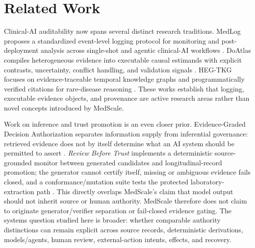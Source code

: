 \section{Related Work}

Clinical-AI auditability now spans several distinct research traditions. MedLog proposes a standardized event-level logging protocol for monitoring and post-deployment analysis across single-shot and agentic clinical-AI workflows \citep{Noori.2025}. DoAtlas compiles heterogeneous evidence into executable causal estimands with explicit contrasts, uncertainty, conflict handling, and validation signals \citep{Li.2026}. HEG-TKG focuses on evidence-traceable temporal knowledge graphs and programmatically verified citations for rare-disease reasoning \citep{Ahmed.2026}. These works establish that logging, executable evidence objects, and provenance are active research areas rather than novel concepts introduced by MedScale.

Work on inference and trust promotion is an even closer prior. Evidence-Graded Decision Authorization separates information supply from inferential governance: retrieved evidence does not by itself determine what an AI system should be permitted to assert \citep{Lin.2026}. \emph{Review Before Trust} implements a deterministic source-grounded monitor between generated candidates and longitudinal-record promotion; the generator cannot certify itself, missing or ambiguous evidence fails closed, and a conformance/mutation suite tests the protected laboratory-extraction path \citep{Girda.2026}. This directly overlaps MedScale's claim that model output should not inherit source or human authority. MedScale therefore does not claim to originate generator/verifier separation or fail-closed evidence gating. The systems question studied here is broader: whether comparable authority distinctions can remain explicit across source records, deterministic derivations, models/agents, human review, external-action intents, effects, and recovery.

